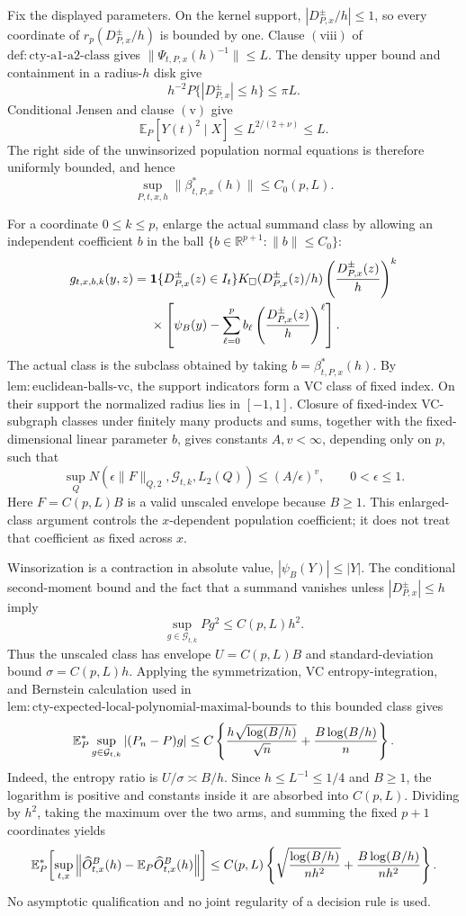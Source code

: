 Fix the displayed parameters.  On the kernel support, \(|D^{\pm}_{P,x}/h|\leq1\), so every coordinate of \(r_p(D^{\pm}_{P,x}/h)\) is bounded by one.  Clause \(\mathrm{(viii)}\) of \(\mathrm{def:cty\text{-}a1\text{-}a2\text{-}class}\) gives \(\|\Psi_{t,P,x}(h)^{-1}\|\leq L\).  The density upper bound and containment in a radius-\(h\) disk give
\[
 h^{-2}P\{|D^{\pm}_{P,x}|\leq h\}\leq \pi L.
\]
Conditional Jensen and clause \(\mathrm{(v)}\) give
\[
 \mathbb E_P[Y(t)^2\mid X]\leq L^{2/(2+\nu)}\leq L.
\]
The right side of the unwinsorized population normal equations is therefore uniformly bounded, and hence
\[
 \sup_{P,t,x,h}\|\beta^*_{t,P,x}(h)\|\leq C_0(p,L).
\]

For a coordinate \(0\leq k\leq p\), enlarge the actual summand class by allowing an independent coefficient \(b\) in the ball \(\{b\in\mathbb R^{p+1}:\|b\|\leq C_0\}\):
\[
\begin{split}
 g_{t,x,b,k}(y,z)
 ={}&\mathbf1\{D^{\pm}_{P,x}(z)\in I_t\}
 K_\square(D^{\pm}_{P,x}(z)/h)
 \left({D^{\pm}_{P,x}(z)\over h}\right)^k\\
 &\times\left[\psi_B(y)-\sum_{\ell=0}^p b_\ell
 \left({D^{\pm}_{P,x}(z)\over h}\right)^\ell\right].
\end{split}
\]
The actual class is the subclass obtained by taking \(b=\beta^*_{t,P,x}(h)\).  By \(\mathrm{lem:euclidean\text{-}balls\text{-}vc}\), the support indicators form a VC class of fixed index.  On their support the normalized radius lies in \([-1,1]\).  Closure of fixed-index VC-subgraph classes under finitely many products and sums, together with the fixed-dimensional linear parameter \(b\), gives constants \(A,v<\infty\), depending only on \(p\), such that
\[
 \sup_Q N\!\left(\epsilon\|F\|_{Q,2},\mathcal G_{t,k},L_2(Q)\right)
 \leq (A/\epsilon)^v,\qquad 0<\epsilon\leq1.
\]
Here \(F=C(p,L)B\) is a valid unscaled envelope because \(B\geq1\).  This enlarged-class argument controls the \(x\)-dependent population coefficient; it does not treat that coefficient as fixed across \(x\).

Winsorization is a contraction in absolute value, \(|\psi_B(Y)|\leq|Y|\).  The conditional second-moment bound and the fact that a summand vanishes unless \(|D^{\pm}_{P,x}|\leq h\) imply
\[
 \sup_{g\in\mathcal G_{t,k}}Pg^2\leq C(p,L)h^2.
\]
Thus the unscaled class has envelope \(U=C(p,L)B\) and standard-deviation bound \(\sigma=C(p,L)h\).  Applying the symmetrization, VC entropy-integration, and Bernstein calculation used in \(\mathrm{lem:cty\text{-}expected\text{-}local\text{-}polynomial\text{-}maximal\text{-}bounds}\) to this bounded class gives
\[
 \mathbb E_P^*\sup_{g\in\mathcal G_{t,k}}|(P_n-P)g|
 \leq C\left\{
 {h\sqrt{\log(B/h)}\over\sqrt n}
 +{B\log(B/h)\over n}
 \right\}.
\]
Indeed, the entropy ratio is \(U/\sigma\asymp B/h\).  Since \(h\leq L^{-1}\leq1/4\) and \(B\geq1\), the logarithm is positive and constants inside it are absorbed into \(C(p,L)\).  Dividing by \(h^2\), taking the maximum over the two arms, and summing the fixed \(p+1\) coordinates yields
\[
 \mathbb E_P^*\!\left[
 \sup_{t,x}\left\|\widehat O^B_{t,x}(h)-\mathbb E_P\widehat O^B_{t,x}(h)\right\|
 \right]
 \leq C(p,L)\left\{
 \sqrt{{\log(B/h)\over nh^2}}+{B\log(B/h)\over nh^2}
 \right\}.
\]
No asymptotic qualification and no joint regularity of a decision rule is used.